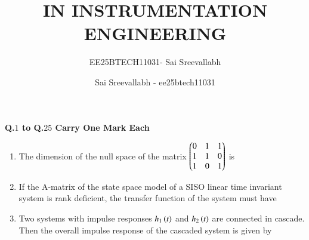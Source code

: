 \documentclass[journal,12pt,onecolumn]{IEEEtran}
\title{IN  INSTRUMENTATION ENGINEERING}
\author{EE25BTECH11031- Sai Sreevallabh}
\author{Sai Sreevallabh - ee25btech11031}
\theoremstyle{remark}
\begin{document}
\maketitle

\textbf{Q.$1$ to Q.$25$ Carry One Mark Each}

\begin{enumerate}

\item The dimension of the null space of the matrix $\begin{pmatrix}0 & 1 & 1 \\ 1 & 1 & 0 \\ 1 & 0 & 1\end{pmatrix}$ is
\par \hfill{}
    \begin{enumerate}
    \end{enumerate}

\item If the A-matrix of the state space model of a SISO linear time invariant system is rank deficient, the transfer function of the system must have
\par \hfill{}
    \begin{enumerate}
    \end{enumerate}

\item Two systems with impulse responses $h_1\left(t\right)$ and $h_2\left(t\right)$ are connected in cascade. Then the overall impulse response of the cascaded system is given by
\par \hfill{}
    \begin{enumerate}
    \end{enumerate}


\end{enumerate}
\end{document}
